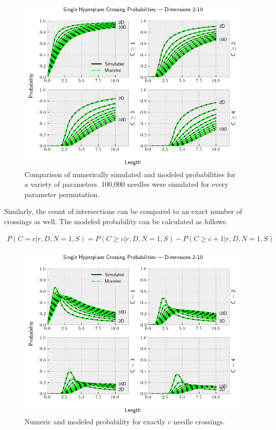 \documentclass{article}
\begin{document}
\begin{figure}
	\centerline{\includegraphics[width=5in]{numeric_sim_N1.png}}
	\caption{Comparison of numerically simulated and modeled probabilities for a variety of parameters.
	100,000 needles were simulated for every parameter permutation.}
	\label{fig:numeric sim N1}
\end{figure}

Similarly, the count of intersections can be compared to an exact number of crossings as well. The modeled
probability can be calculated as follows.

\begin{gather}
	P(C=c|r, D, N=1, S) = P(C\ge c|r, D, N=1, S) - P(C\ge c+1|r, D, N=1, S)
\end{gather}

\begin{figure}
	\centerline{\includegraphics[width=5in]{numeric_sim_N1_e.png}}
	\caption{Numeric and modeled probability for exactly $c$ needle crossings.}
	\label{fig:numeric sim N1 e}
\end{figure}
\end{document}
